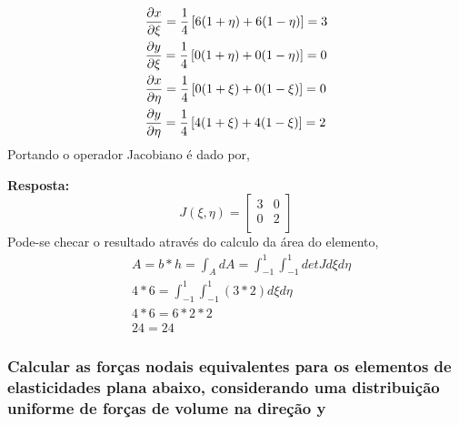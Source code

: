 \begin{itemize}
	\begin{equation}
		\begin{split}
			&	\frac{\partial x}{\partial \xi } = \frac{1}{4}\left[ 6(1 + \eta) + 6(1 - \eta) \right] = 3\\
			&   \frac{\partial y}{\partial \xi } = \frac{1}{4}\left[ 0(1 + \eta) + 0(1 - \eta) \right] = 0\\
			&   \frac{\partial x}{\partial \eta} = \frac{1}{4}\left[ 0(1 + \xi ) + 0(1 - \xi ) \right] = 0\\
			&   \frac{\partial y}{\partial \eta} = \frac{1}{4}\left[ 4(1 + \xi ) + 4(1 - \xi ) \right] = 2
		\end{split}
	\end{equation}
	Portando o operador Jacobiano é dado por,

	\color{blue}
	\textbf{Resposta:}
	\begin{equation}
	J(\xi, \eta) = 
	\begin{bmatrix}
		3 & 0\\
		0 & 2\\
	\end{bmatrix}
	\end{equation}	
	\color{black}
	Pode-se checar o resultado através do calculo da área do elemento,
	\begin{equation}
		\begin{split}
		& A = b * h = \int_A dA = \int_{-1}^1 \int_{-1}^1 det J d\xi d\eta\\
		& 4 * 6 = \int_{-1}^1 \int_{-1}^1 \left(3 * 2\right)  d\xi d\eta\\
		& 4 * 6 = 6 * 2 * 2 \\
		& 24 = 24		
		\end{split}
	\end{equation}
\end{itemize}

\subsubsection{Calcular as forças nodais equivalentes para os elementos de elasticidades plana abaixo, considerando uma distribuição uniforme de forças de volume na direção y}

